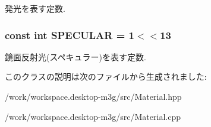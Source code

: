発光を表す定数. \hypertarget{classm3g_1_1Material_cac20b25665d9a3713bec3a772a89ede}{
\subsubsection[{SPECULAR}]{\setlength{\rightskip}{0pt plus 5cm}const int {\bf SPECULAR} = 1$<$$<$13}}
\label{classm3g_1_1Material_cac20b25665d9a3713bec3a772a89ede}


鏡面反射光(スペキュラー)を表す定数. 

このクラスの説明は次のファイルから生成されました:\begin{CompactItemize}
\item 
/work/workspace.desktop-m3g/src/Material.hpp\item 
/work/workspace.desktop-m3g/src/Material.cpp\end{CompactItemize}
